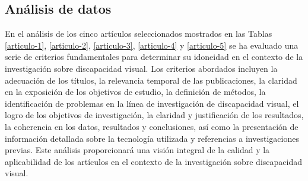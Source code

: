 \documentclass[letterpaper]{article}
\begin{document}
    \subsection{Análisis de datos}
	En el análisis de los cinco artículos seleccionados mostrados en las Tablas \ref{articulo-1}, \ref{articulo-2}, \ref{articulo-3}, \ref{articulo-4} y \ref{articulo-5} se ha evaluado una serie de criterios fundamentales para determinar su idoneidad en el contexto de la investigación sobre discapacidad visual. Los criterios abordados incluyen la adecuación de los títulos, la relevancia temporal de las publicaciones, la claridad en la exposición de los objetivos de estudio, la definición de métodos, la identificación de problemas en la línea de investigación de discapacidad visual, el logro de los objetivos de investigación, la claridad y justificación de los resultados, la coherencia en los datos, resultados y conclusiones, así como la presentación de información detallada sobre la tecnología utilizada y referencias a investigaciones previas. Este análisis proporcionará una visión integral de la calidad y la aplicabilidad de los artículos en el contexto de la investigación sobre discapacidad visual.
\end{document}
